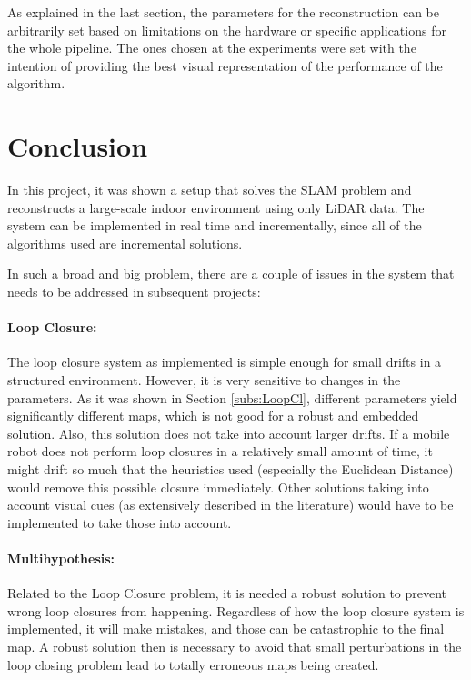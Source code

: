 \documentclass[11pt]{article}
\begin{document}
As explained in the last section, the parameters for the reconstruction can be arbitrarily set based on limitations on the hardware or specific applications for the whole pipeline. The ones chosen at the experiments were set with the intention of providing the best visual representation of the performance of the algorithm.
		
	\newpage
	\section{Conclusion}
	
In this project, it was shown a setup that solves the SLAM problem and reconstructs a large-scale indoor environment using only LiDAR data. The system can be implemented in real time and incrementally, since all of the algorithms used are incremental solutions.
		
In such a broad and big problem, there are a couple of issues in the system that needs to be addressed in subsequent projects:
	
\paragraph{Loop Closure: } The loop closure system as implemented is simple enough for small drifts in a structured environment. However, it is very sensitive to changes in the parameters. As it was shown in Section \ref{subs:LoopCl}, different parameters yield significantly different maps, which is not good for a robust and embedded solution. Also, this solution does not take into account larger drifts. If a mobile robot does not perform loop closures in a relatively small amount of time, it might drift so much that the heuristics used (especially the Euclidean Distance) would remove this possible closure immediately. Other solutions taking into account visual cues (as extensively described in the literature) would have to be implemented to take those into account.
	
\paragraph{Multihypothesis: } Related to the Loop Closure problem, it is needed a robust solution to prevent wrong loop closures from happening. Regardless of how the loop closure system is implemented, it will make mistakes, and those can be catastrophic to the final map. A robust solution then is necessary to avoid that small perturbations in the loop closing problem lead to totally erroneous maps being created.
	
\end{document}
